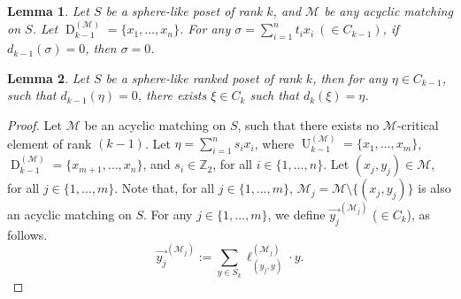 \documentclass[10pt,a4paper]{amsart}
\newtheorem{lemma}{Lemma}
\newcommand{\M}{\mathcal{M}}
\newcommand{\dn}{\operatorname{D}}
\newcommand{\up}{\operatorname{U}}
\begin{document}
     \begin{lemma}\label{dn}
     	Let $S$ be a sphere-like poset of rank $k$, and $\M$ be any acyclic matching on
     	 $S$. Let $ \dn_{k-1}^{(\M)}=\{x_1,\ldots,x_n\}$. For any $\sigma=\sum_{i=1}^n t_ix_i ~(\in C_{k-1})$, if $d_{k-1}(\sigma)=0$, then $\sigma=0$.
     \end{lemma}

     \begin{lemma} \label{bd}
     	Let $S$ be a sphere-like ranked poset of rank $k$, then for any $\eta\in C_{k-1}$, such that $d_{k-1}(\eta)=0$, there exists $\xi\in C_k$ such that $d_k(\xi)=\eta$.
     \end{lemma}

     \begin{proof}
     	Let $\M$ be an acyclic matching on $S$, such that there exists no $\M$-critical element of rank $(k-1)$. Let $\eta=\sum_{i=1}^{n} s_i x_i$, where $\up_{k-1}^{(\M)}=\{x_1,\ldots,x_m\}$, $\dn_{k-1}^{(\M)}=\{x_{m+1},\ldots,x_{n}\}$, and $s_i\in \mathbb{Z}_2$, for all $i \in \{1,\ldots,n\}$.  Let $(x_j,y_j)\in \M$, for all $j\in \{1,\ldots,m\}$.	 Note that, for all $j\in\{1,\ldots,m\}$, $\M_j=\M\setminus\{(x_j,y_j)\}$ is also an acyclic matching on $S$.
     	For any $j\in \{1,\ldots,m\}$, we define $\overrightarrow{y_j}^{(\M_j)}$ ($\in C_k$), as follows.
     	\[ \overrightarrow{y_j}^{(\M_j)}:= \sum_{y\in S_k} \ell^{(\M_j)}_{(y_j,y)}\cdot y.\]
     

\end{proof}
\end{document}
